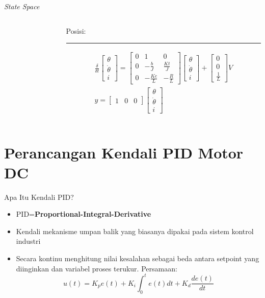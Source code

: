 \documentclass[10pt,xcolor={dvipsnames}]{beamer}
\begin{document}
\begin{frame}{\textit{State Space}}
\begin{columns}[T]
\begin{column}{0.5\textwidth}
				\end{column}%
				\hfill%
				\begin{column}{0.5\textwidth}
					Posisi:\newline
					\color{myNewColorA}\rule{\linewidth}{4pt}
					\begin{equation}
						\begin{split}
							\frac{\delta}{\delta t}
							\begin{bmatrix}
								\theta \\ \dot{\theta} \\ i
							\end{bmatrix}
							=
							\begin{bmatrix}
								0 & 1 & 0\\
								0 & -\frac{b}{J} & \frac{Kt}{J}\\
								0 & -\frac{Ke}{L} & -\frac{R}{L}
							\end{bmatrix}
							\begin{bmatrix}
								\theta \\ \dot{\theta} \\ i
							\end{bmatrix}
							+
							\begin{bmatrix}
								0 \\ 0 \\ \frac{1}{L}
							\end{bmatrix}
							V\\
							y=
							\begin{bmatrix}
								1 & 0 & 0
							\end{bmatrix}
							\begin{bmatrix}
								\theta \\ \dot{\theta} \\ i
							\end{bmatrix}
						\end{split}
					\end{equation}
				\end{column}
			\end{columns}
		\end{frame}
		
		\section{Perancangan Kendali PID Motor DC}
		\begin{frame}{Apa Itu Kendali PID?}
			\begin{itemize}
				\item PID=\textbf{Proportional-Integral-Derivative}
				\item Kendali mekanisme umpan balik yang biasanya dipakai pada sistem kontrol industri
				\item Secara kontinu menghitung nilai kesalahan sebagai beda antara setpoint yang diinginkan dan variabel proses terukur.
				Persamaan:
				\begin{equation}
					u(t)=K_{p}e(t)+K_{i}\int_{0}^{t}e(t)dt+K_{d}\frac{de(t)}{dt}
				\end{equation}
			\end{itemize}
		\end{frame}
		
\end{document}
